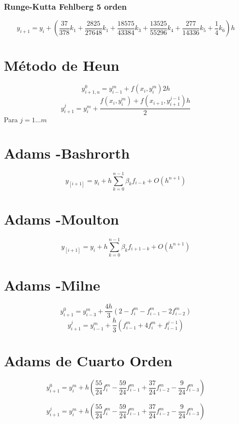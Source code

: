             \subsubsection{Runge-Kutta Fehlberg 5 orden}
            $$y_{i+1} = y_i +  (\frac{37}{378}k_1 +\frac{2825}{27648}k_1 +\frac{18575}{43384}k_3 +\frac{13525}{55296}k_4 + \frac{277}{14336}k_5 + \frac{1}{4}k_6 )h$$
            \begin{multicols}{2}
            	\section{Método de Heun}
                $$
                y^0_{i+1,u} = y_{i-1}^m + f(x_i,y_i^m)2h
                $$
                $$
                 y^j_{i+1} = y_i^m + \frac{f(x_i,y_i^m) +f(x_{i+1},y_{i+1}^{j-1})h}{2}
                $$
                Para $ j= 1\ldots m$
                
                \section{Adams -Bashrorth}
                $$
                y_[i+1] = y_i + h\sum_{k=0}^{n-1} \beta_kf_{i-k} + O(h^{n+1})
                $$
                \section{Adams -Moulton}
                 $$ y_[i+1] = y_i + h\sum_{k=0}^{n-1} \beta_kf_{i+1-k} + O(h^{n+1})  $$
                 \section{Adams -Milne}
                 $$
                 	 y_{i+1}^{0} = y_{i-3}^{m} + \frac{4h}{3}( 2-f_i^m -f_{i-1}^m -2f_{i-2}^m )
                 $$
                 $$
                 	 y_{i+1}^{j} = y_{i-1}^{m} + \frac{h}{3}( f_{i-1}^m +4f_{i}^m +f_{i-1}^{j-1} )
                 $$
                 
                 \section{Adams de Cuarto Orden}
                 $$
                 	y_{i+1}^0 = y_i^m + h(\frac{55}{24}f_i^m -\frac{59}{24}f_{i-1}^{m} + \frac{37}{24} f_{i-2}^{m} - \frac{9}{24}f_{i-3}^{m} )
                 $$
                 
                  $$
                 	y_{i+1}^j = y_i^m + h(\frac{55}{24}f_i^m -\frac{59}{24}f_{i-1}^{m} + \frac{37}{24}f_{i-2}^{m} - \frac{9}{24}f_{i-3}^{m} )
                 $$
            \end{multicols} 